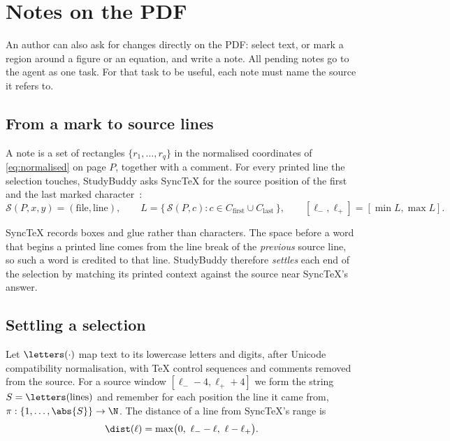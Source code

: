\section{Notes on the PDF}
\label{sec:notes}

An author can also ask for changes directly on the PDF: select text, or mark a
region around a figure or an equation, and write a note. All pending notes go
to the agent as one task. For that task to be useful, each note must name the
source it refers to.

\subsection{From a mark to source lines}

A note is a set of rectangles $\{r_1, \dots, r_q\}$ in the normalised
coordinates of \cref{eq:normalised} on page $P$, together with a comment. For
every printed line the selection touches, StudyBuddy asks SyncTeX for the source
position of the first and the last marked character~\cite{laurens2008}:
\begin{equation}
  \mathcal{S}(P, x, y) = (\text{file}, \text{line}),
  \qquad
  L = \{\, \mathcal{S}(P, c) : c \in C_{\text{first}} \cup C_{\text{last}} \,\},
  \qquad
  [\ell_{-}, \ell_{+}] = [\min L, \max L].
  \label{eq:synctex-range}
\end{equation}

SyncTeX records boxes and glue rather than characters. The space before a word
that begins a printed line comes from the line break of the \emph{previous}
source line, so such a word is credited to that line. StudyBuddy therefore
\emph{settles} each end of the selection by matching its printed context
against the source near SyncTeX's answer.

\subsection{Settling a selection}

Let $\letters(\cdot)$ map text to its lowercase letters and digits, after
Unicode compatibility normalisation, with \TeX{} control sequences and comments
removed from the source. For a source window $[\ell_{-} - 4, \ell_{+} + 4]$ we
form the string $S = \letters(\text{lines})$ and remember for each position the
line it came from, $\pi : \{1, \dots, \abs{S}\} \to \N$. The distance of a
line from SyncTeX's range is
\begin{equation}
  \dist(\ell) = \max\bigl(0,\ \ell_{-} - \ell,\ \ell - \ell_{+}\bigr).
  \label{eq:line-distance}
\end{equation}


